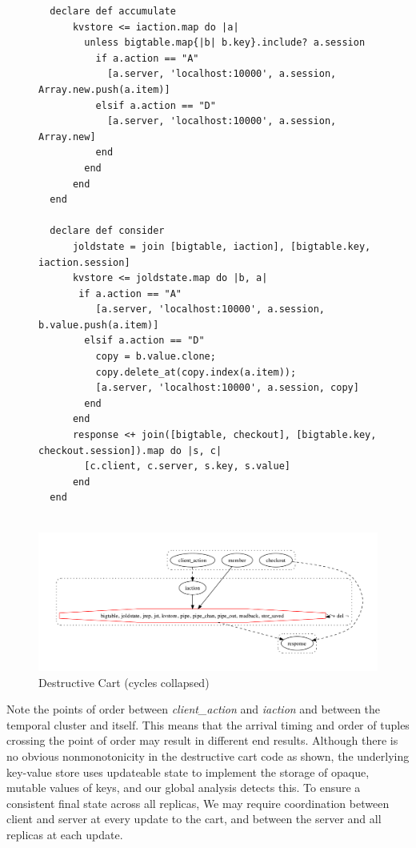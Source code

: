 \begin{figure}[t]
\begin{tiny}
\begin{verbatim}
  declare def accumulate
      kvstore <= iaction.map do |a| 
        unless bigtable.map{|b| b.key}.include? a.session
          if a.action == "A"
            [a.server, 'localhost:10000', a.session, Array.new.push(a.item)]
          elsif a.action == "D"
            [a.server, 'localhost:10000', a.session, Array.new]
          end
        end
      end
  end

  declare def consider
      joldstate = join [bigtable, iaction], [bigtable.key, iaction.session]
      kvstore <= joldstate.map do |b, a| 
       if a.action == "A"
          [a.server, 'localhost:10000', a.session, b.value.push(a.item)]
        elsif a.action == "D"
          copy = b.value.clone;
          copy.delete_at(copy.index(a.item));
          [a.server, 'localhost:10000', a.session, copy]
        end
      end
      response <+ join([bigtable, checkout], [bigtable.key, checkout.session]).map do |s, c|
        [c.client, c.server, s.key, s.value]
      end
  end


\end{verbatim}
\end{tiny}
\centering
\includegraphics[width=1.2\linewidth]{fig/ImperativeCartServer_gvoutput.pdf}

\caption{Destructive Cart (cycles collapsed)}
\label{fig:pdg-destructive}
\end{figure}

Note the points of order between \emph{client\_action} and \emph{iaction}
and between the temporal cluster and itself.  This means that the arrival 
timing and order of tuples crossing the point of order may result in different
end results.  Although there is no obvious nonmonotonicity in the destructive
cart code as shown, the underlying key-value store uses updateable state
to implement the storage of opaque, mutable values of keys, and our global
analysis detects this.
To ensure a consistent final state across all replicas, We may require coordination
between client and server at every update to the cart, and between the 
server and all replicas at each update.  

